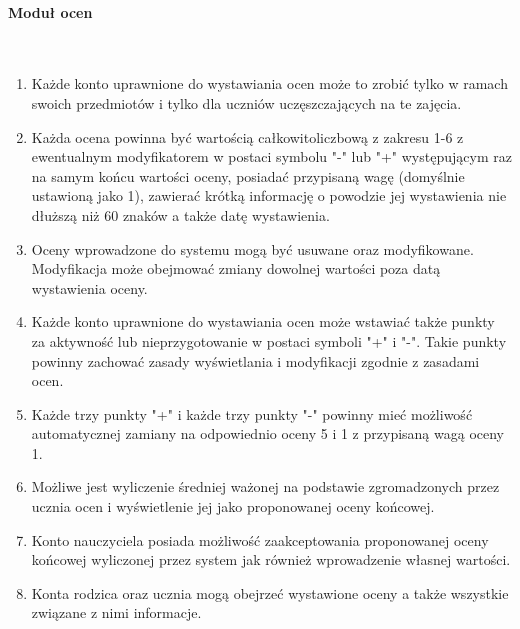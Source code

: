 \documentclass{article}
\begin{document}
\paragraph{Moduł ocen} \mbox{}\\
\begin{enumerate}
	\item Każde konto uprawnione do wystawiania ocen może to zrobić tylko w ramach swoich przedmiotów i tylko dla uczniów uczęszczających na te zajęcia.
    \item Każda ocena powinna być wartością całkowitoliczbową z zakresu 1-6 z ewentualnym modyfikatorem w postaci symbolu "-" lub "+" występującym raz na samym końcu wartości oceny, posiadać przypisaną wagę (domyślnie ustawioną jako 1), zawierać krótką informację o powodzie jej wystawienia nie dłuższą niż 60 znaków a także datę wystawienia.
    \item Oceny wprowadzone do systemu mogą być usuwane oraz modyfikowane. Modyfikacja może obejmować zmiany dowolnej wartości poza datą wystawienia oceny.
    \item Każde konto uprawnione do wystawiania ocen może wstawiać także punkty za aktywność lub nieprzygotowanie w postaci symboli "+" i "-". Takie punkty powinny zachować zasady wyświetlania i modyfikacji zgodnie z zasadami ocen.
	\item Każde trzy punkty "+" i każde trzy punkty "-" powinny mieć możliwość automatycznej zamiany na odpowiednio oceny 5 i 1 z przypisaną wagą oceny 1.
    \item Możliwe jest wyliczenie średniej ważonej na podstawie zgromadzonych przez ucznia ocen i wyświetlenie jej jako proponowanej oceny końcowej.
    \item Konto nauczyciela posiada możliwość zaakceptowania proponowanej oceny końcowej wyliczonej przez system jak również wprowadzenie własnej wartości.
    \item Konta rodzica oraz ucznia mogą obejrzeć wystawione oceny a także wszystkie związane z nimi informacje.
\end{enumerate}
\end{document}
